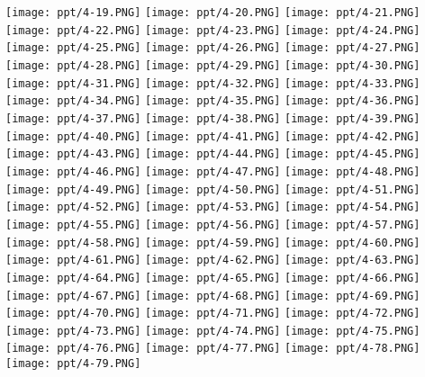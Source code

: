 \documentclass[UTF-8]{ctexart}
\begin{document}
\begin{center}
\texttt{[image: ppt/4-19.PNG]}
\texttt{[image: ppt/4-20.PNG]}
\texttt{[image: ppt/4-21.PNG]}
\texttt{[image: ppt/4-22.PNG]}
\texttt{[image: ppt/4-23.PNG]}
\texttt{[image: ppt/4-24.PNG]}
\texttt{[image: ppt/4-25.PNG]}
\texttt{[image: ppt/4-26.PNG]}
\texttt{[image: ppt/4-27.PNG]}
\texttt{[image: ppt/4-28.PNG]}
\texttt{[image: ppt/4-29.PNG]}
\texttt{[image: ppt/4-30.PNG]}
\texttt{[image: ppt/4-31.PNG]}
\texttt{[image: ppt/4-32.PNG]}
\texttt{[image: ppt/4-33.PNG]}
\texttt{[image: ppt/4-34.PNG]}
\texttt{[image: ppt/4-35.PNG]}
\texttt{[image: ppt/4-36.PNG]}
\texttt{[image: ppt/4-37.PNG]}
\texttt{[image: ppt/4-38.PNG]}
\texttt{[image: ppt/4-39.PNG]}
\texttt{[image: ppt/4-40.PNG]}
\texttt{[image: ppt/4-41.PNG]}
\texttt{[image: ppt/4-42.PNG]}
\texttt{[image: ppt/4-43.PNG]}
\texttt{[image: ppt/4-44.PNG]}
\texttt{[image: ppt/4-45.PNG]}
\texttt{[image: ppt/4-46.PNG]}
\texttt{[image: ppt/4-47.PNG]}
\texttt{[image: ppt/4-48.PNG]}
\texttt{[image: ppt/4-49.PNG]}
\texttt{[image: ppt/4-50.PNG]}
\texttt{[image: ppt/4-51.PNG]}
\texttt{[image: ppt/4-52.PNG]}
\texttt{[image: ppt/4-53.PNG]}
\texttt{[image: ppt/4-54.PNG]}
\texttt{[image: ppt/4-55.PNG]}
\texttt{[image: ppt/4-56.PNG]}
\texttt{[image: ppt/4-57.PNG]}
\texttt{[image: ppt/4-58.PNG]}
\texttt{[image: ppt/4-59.PNG]}
\texttt{[image: ppt/4-60.PNG]}
\texttt{[image: ppt/4-61.PNG]}
\texttt{[image: ppt/4-62.PNG]}
\texttt{[image: ppt/4-63.PNG]}
\texttt{[image: ppt/4-64.PNG]}
\texttt{[image: ppt/4-65.PNG]}
\texttt{[image: ppt/4-66.PNG]}
\texttt{[image: ppt/4-67.PNG]}
\texttt{[image: ppt/4-68.PNG]}
\texttt{[image: ppt/4-69.PNG]}
\texttt{[image: ppt/4-70.PNG]}
\texttt{[image: ppt/4-71.PNG]}
\texttt{[image: ppt/4-72.PNG]}
\texttt{[image: ppt/4-73.PNG]}
\texttt{[image: ppt/4-74.PNG]}
\texttt{[image: ppt/4-75.PNG]}
\texttt{[image: ppt/4-76.PNG]}
\texttt{[image: ppt/4-77.PNG]}
\texttt{[image: ppt/4-78.PNG]}
\texttt{[image: ppt/4-79.PNG]}

\end{center}
\end{document}
